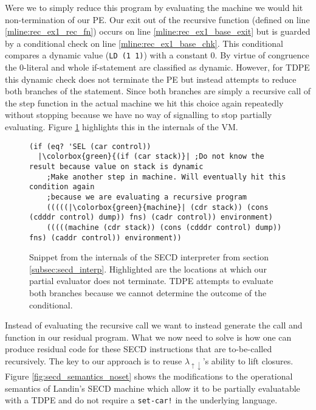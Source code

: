 \documentclass[a4paper,12pt,twoside,openright]{report}
\theoremstyle{definition}
\newcommand{\mslang}{$\lambda_{\uparrow\downarrow}$}
\begin{document}
Were we to simply reduce this program by evaluating the machine we would hit non-termination of our PE. Our exit out of the recursive function (defined on line \ref{mline:rec_ex1_rec_fn}) occurs on line \ref{mline:rec_ex1_base_exit} but is guarded by a conditional check on line \ref{mline:rec_ex1_base_chk}. This conditional compares a dynamic value (\texttt{LD (1 1)}) with a constant 0. By virtue of congruence the 0-literal and whole if-statement are classified as dynamic. However, for TDPE this dynamic check does not terminate the PE but instead attempts to reduce both branches of the statement. Since both branches are simply a recursive call of the step function in the actual machine we hit this choice again repeatedly without stopping because we have no way of signalling to stop partially evaluating. Figure \ref{lst:secd_recursion_machine_ex1} highlights this in the internals of the VM.

\begin{figure}[ht!]
\begin{verbatim}
(if (eq? 'SEL (car control))
  |\colorbox{green}{(if (car stack)}| ;Do not know the result because value on stack is dynamic
    ;Make another step in machine. Will eventually hit this condition again
    ;because we are evaluating a recursive program
    (((((|\colorbox{green}{machine}| (cdr stack)) (cons (cdddr control) dump)) fns) (cadr control)) environment)
    (((((machine (cdr stack)) (cons (cdddr control) dump)) fns) (caddr control)) environment))
\end{verbatim}
\caption{Snippet from the internals of the SECD interpreter from section \ref{subsec:secd_interp}. Highlighted are the locations at which our partial evaluator does not terminate. TDPE attempts to evaluate both branches because we cannot determine the outcome of the conditional.}
\label{lst:secd_recursion_machine_ex1}
\end{figure}

Instead of evaluating the recursive call we want to instead generate the call and function in our residual program. What we now need to solve is how one can produce residual code for these SECD instructions that are to-be-called recursively. The key to our approach is to reuse \mslang's ability to lift closures. Figure \ref{fig:secd_semantics_noset} shows the modifications to the operational semantics of Landin's SECD machine \cite{landin1964mechanical} which allow it to be partially evaluatable with a TDPE and do not require a \texttt{set-car!} in the underlying language.
\end{document}
